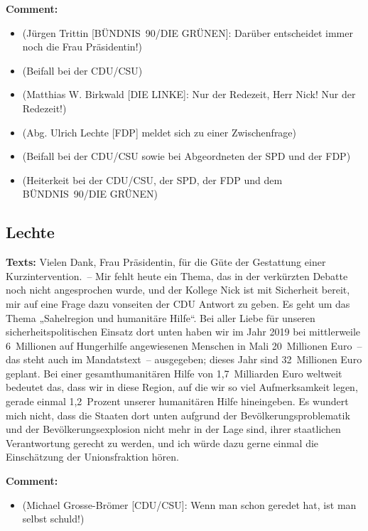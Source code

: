 \documentclass{article}
\begin{document}
\noindent\textbf{Comment:}
\begin{itemize}
    \setlength\itemsep{-3pt}
    \item (Jürgen Trittin [BÜNDNIS 90/DIE GRÜNEN]: Darüber entscheidet immer noch die Frau Präsidentin!)
    \setlength\itemsep{-3pt}
    \item (Beifall bei der CDU/CSU)
    \setlength\itemsep{-3pt}
    \item (Matthias W. Birkwald [DIE LINKE]: Nur der Redezeit, Herr Nick! Nur der Redezeit!)
    \setlength\itemsep{-3pt}
    \item (Abg. Ulrich Lechte [FDP] meldet sich zu einer Zwischenfrage)
    \setlength\itemsep{-3pt}
    \item (Beifall bei der CDU/CSU sowie bei Abgeordneten der SPD und der FDP)
    \setlength\itemsep{-3pt}
    \item (Heiterkeit bei der CDU/CSU, der SPD, der FDP und dem BÜNDNIS 90/DIE GRÜNEN)
\end{itemize}
\subsection{Lechte}
\noindent\textbf{Texts:} Vielen Dank, Frau Präsidentin, für die Güte der Gestattung einer Kurzintervention. – Mir fehlt heute ein Thema, das in der verkürzten Debatte noch nicht angesprochen wurde, und der Kollege Nick ist mit Sicherheit bereit, mir auf eine Frage dazu vonseiten der CDU Antwort zu geben.  Es geht um das Thema „Sahelregion und humanitäre Hilfe“. Bei aller Liebe für unseren sicherheitspolitischen Einsatz dort unten haben wir im Jahr 2019 bei mittlerweile 6 Millionen auf Hungerhilfe angewiesenen Menschen in Mali 20 Millionen Euro – das steht auch im Mandatstext – ausgegeben; dieses Jahr sind 32 Millionen Euro geplant. Bei einer gesamthumanitären Hilfe von 1,7 Milliarden Euro weltweit bedeutet das, dass wir in diese Region, auf die wir so viel Aufmerksamkeit legen, gerade einmal 1,2 Prozent unserer humanitären Hilfe hineingeben. Es wundert mich nicht, dass die Staaten dort unten aufgrund der Bevölkerungsproblematik und der Bevölkerungsexplosion nicht mehr in der Lage sind, ihrer staatlichen Verantwortung gerecht zu werden, und ich würde dazu gerne einmal die Einschätzung der Unionsfraktion hören.

\noindent\textbf{Comment:}
\begin{itemize}
    \setlength\itemsep{-3pt}
    \item (Michael Grosse-Brömer [CDU/CSU]: Wenn man schon geredet hat, ist man selbst schuld!)
\end{itemize}
\end{document}
